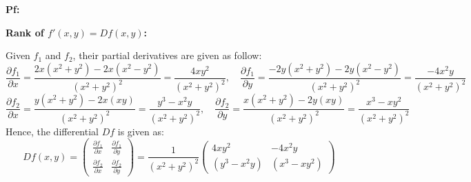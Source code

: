 \documentclass{article}
\begin{document}
\textbf{Pf:}

\textbf{Rank of $f'(x,y)=Df(x,y)$:}

Given $f_1$ and $f_2$, their partial derivatives are given as follow:
$$\frac{\partial f_1}{\partial x} = \frac{2x(x^2+y^2)-2x(x^2-y^2)}{(x^2+y^2)^2} = \frac{4xy^2}{(x^2+y^2)^2},\quad \frac{\partial f_1}{\partial y}=\frac{-2y(x^2+y^2)-2y(x^2-y^2)}{(x^2+y^2)^2}=\frac{-4x^2y}{(x^2+y^2)^2}$$
$$\frac{\partial f_2}{\partial x}=\frac{y(x^2+y^2)-2x(xy)}{(x^2+y^2)^2}=\frac{y^3-x^2y}{(x^2+y^2)^2},\quad \frac{\partial f_2}{\partial y}=\frac{x(x^2+y^2)-2y(xy)}{(x^2+y^2)^2}=\frac{x^3-xy^2}{(x^2+y^2)^2}$$
Hence, the differential $Df$ is given as:
$$Df(x,y)=\begin{pmatrix}
    \frac{\partial f_1}{\partial x} & \frac{\partial f_1}{\partial y}\\
    \frac{\partial f_2}{\partial x} & \frac{\partial f_2}{\partial y}
\end{pmatrix}=\frac{1}{(x^2+y^2)^2}\begin{pmatrix}
    4xy^2 & -4x^2y\\
    (y^3-x^2y) & (x^3-xy^2)
\end{pmatrix}$$
\end{document}
